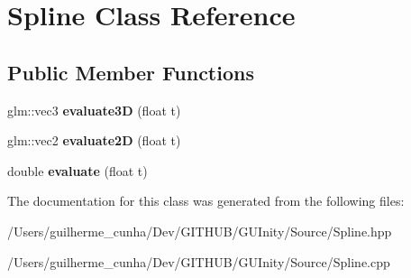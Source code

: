 \hypertarget{class_spline}{}\section{Spline Class Reference}
\label{class_spline}
\subsection*{Public Member Functions}
\begin{DoxyCompactItemize}
\item 
\hypertarget{class_spline_a362edea61055caf618d97e2c497b906b}{}glm\+::vec3 {\bfseries evaluate3\+D} (float t)\label{class_spline_a362edea61055caf618d97e2c497b906b}

\item 
\hypertarget{class_spline_abc6b72ed5a74f1990efa26bc0058c7f4}{}glm\+::vec2 {\bfseries evaluate2\+D} (float t)\label{class_spline_abc6b72ed5a74f1990efa26bc0058c7f4}

\item 
\hypertarget{class_spline_a478aa5a9a0f6db557f752deef15f2689}{}double {\bfseries evaluate} (float t)\label{class_spline_a478aa5a9a0f6db557f752deef15f2689}

\end{DoxyCompactItemize}


The documentation for this class was generated from the following files\+:\begin{DoxyCompactItemize}
\item 
/\+Users/guilherme\+\_\+cunha/\+Dev/\+G\+I\+T\+H\+U\+B/\+G\+U\+Inity/\+Source/Spline.\+hpp\item 
/\+Users/guilherme\+\_\+cunha/\+Dev/\+G\+I\+T\+H\+U\+B/\+G\+U\+Inity/\+Source/Spline.\+cpp\end{DoxyCompactItemize}
